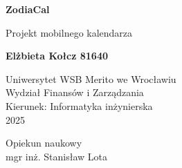 \begin{titlepage}
    \begin{center}
        \vspace*{1cm}
        
        \Huge
        \textbf{ZodiaCal}
        
        \vspace{0.5cm}
        \LARGE
        Projekt mobilnego kalendarza

        \vspace{5cm}

        
        \textbf{Elżbieta Kołcz 81640}


        \vspace{0.5cm}

        \Large
        Uniwersytet WSB Merito we Wrocławiu\\
        Wydział Finansów i Zarządzania\\
        Kierunek: Informatyka inżynierska\\
        2025
        
        \vfill
        Opiekun naukowy\\
        mgr inż. Stanisław Lota

        
        \vspace{0.8cm}
    \end{center}
\end{titlepage}
